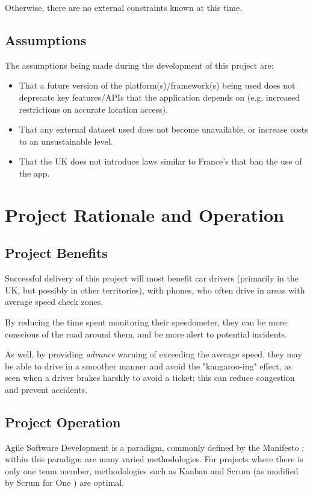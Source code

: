 \documentclass[11pt, a4paper, notitlepage]{report}
\begin{document}
Otherwise, there are no external constraints known at this time.

\section{Assumptions}
The assumptions being made during the development of this project are:
\begin{itemize}
    \item That a future version of the platform(s)/framework(s) being used does not deprecate key features/APIs that the application depends on (e.g. increased restrictions on accurate location access).
    \item That any external dataset used does not become unavailable, or increase costs to an unsustainable level.
    \item That the UK does not introduce laws similar to France's that ban the use of the app.
\end{itemize}

\chapter{Project Rationale and Operation}
\section{Project Benefits}
Successful delivery of this project will most benefit car drivers (primarily in 
the UK, but possibly in other territories), with phones, who often drive in 
areas with average speed check zones. 

By reducing the time spent monitoring their speedometer, they can be more 
conscious of the road around them, and be more alert to potential incidents.

As well, by providing \textit{advance} warning of exceeding the average speed, 
they may be able to drive in a smoother manner and avoid the "kangaroo-ing" 
effect, as seen when a driver brakes harshly to avoid a ticket; this can reduce 
congestion and prevent accidents.

\section{Project Operation}\label{sec:projectOperation}
Agile Software Development is a paradigm, commonly defined by the Manifesto \citep{AgileManifesto}; within this paradigm are many varied methodologies. For 
projects where there is only one team member, methodologies such as Kanban and 
Scrum (as modified by Scrum for One \citep{ScrumForOne}) are optimal. %
\end{document}

